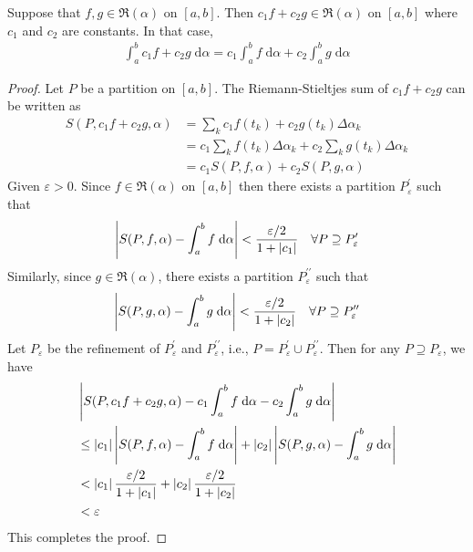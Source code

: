 \documentclass[thmcnt=section, 12pt]{my-elegantbook}
\begin{document}
\begin{theorem} \label{thm:18}
    Suppose that $f, g \in \mathfrak{R}(\alpha)$ on $[a,b]$. Then $c_1 f + c_2 g \in \mathfrak{R}(\alpha)$ on $[a,b]$ where $c_1$ and $c_2$ are constants. In that case,
    \begin{align*}
        \int_a^b c_1 f + c_2 g \; \mathrm{d}\alpha
        = c_1 \int_a^b f \; \mathrm{d}\alpha
        + c_2 \int_a^b g \; \mathrm{d}\alpha
    \end{align*}
\end{theorem}

\begin{proof}
    Let $P$ be a partition on $[a,b]$. The Riemann-Stieltjes sum of $c_1 f + c_2 g$ can be written as
    \begin{align*}
        S(P, c_1 f + c_2 g, \alpha)
         & = \sum_{k} c_1 f(t_k) + c_2 g(t_k) \Delta\alpha_k \\
         & = c_1 \sum_{k} f(t_k) \Delta\alpha_k
        + c_2 \sum_{k} g(t_k) \Delta\alpha_k                 \\
         & = c_1 S(P, f, \alpha) + c_2 S(P, g, \alpha)
    \end{align*}
    Given $\varepsilon > 0$. Since $f \in \mathfrak{R}(\alpha)$ on $[a,b]$ then there exists a partition $P_\varepsilon^{\prime}$
    such that
    \begin{align*}
        \left\lvert S(P, f, \alpha) - \int_a^b f \; \mathrm{d}\alpha \right\rvert < \frac{\varepsilon / 2}{1 + \left\lvert c_1 \right\rvert}
        \quad \forall P \supseteq P_\varepsilon^{\prime}
    \end{align*}
    Similarly, since $g \in \mathfrak{R}(\alpha)$, there exists a partition $P_\varepsilon^{\prime\prime}$ such that
    \begin{align*}
        \left\lvert S(P, g, \alpha) - \int_a^b g \; \mathrm{d}\alpha \right\rvert < \frac{\varepsilon / 2}{1 + \left\lvert c_2 \right\rvert}
        \quad \forall P \supseteq P_\varepsilon^{\prime\prime}
    \end{align*}
    Let $P_\varepsilon$ be the refinement of $P_\varepsilon^{\prime}$ and $P_\varepsilon^{\prime\prime}$, i.e., $P = P_\varepsilon^{\prime} \cup P_\varepsilon^{\prime\prime}$. Then for any $P \supseteq P_\varepsilon$, we have
    \begin{align*}
         & \left\lvert 
            S(P, c_1 f + c_2 g, \alpha)
            - c_1 \int_a^b f \; \mathrm{d}\alpha
            - c_2 \int_a^b g \; \mathrm{d}\alpha
         \right\rvert                                                                      \\
         & \leq \left\lvert c_1 \right\rvert \left\lvert S(P,f,\alpha) - \int_a^b f \; \mathrm{d}\alpha \right\rvert
        + \left\lvert c_2 \right\rvert \left\lvert S(P,g,\alpha) - \int_a^b g \; \mathrm{d}\alpha \right\rvert       \\
         & < \left\lvert c_1 \right\rvert \frac{\varepsilon / 2}{1 + \left\lvert c_1 \right\rvert}
        + \left\lvert c_2 \right\rvert \frac{\varepsilon / 2}{1 + \left\lvert c_2 \right\rvert}                      \\
         & < \varepsilon
    \end{align*}
    This completes the proof.
\end{proof}
\end{document}
